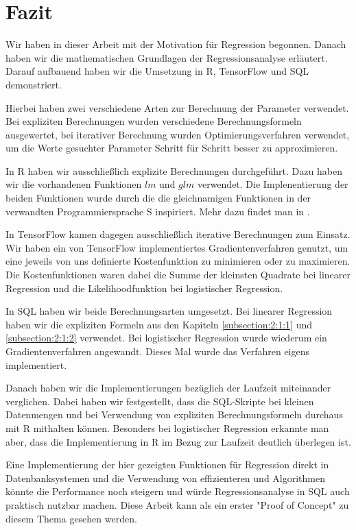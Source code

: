 \chapter{Fazit}
\label{chapter:6}

Wir haben in dieser Arbeit mit der Motivation für Regression begonnen. Danach haben wir die mathematischen Grundlagen der Regressionsanalyse erläutert. Darauf aufbauend haben wir die Umsetzung in R, TensorFlow und SQL demonstriert.

Hierbei haben zwei verschiedene Arten zur Berechnung der Parameter verwendet. Bei expliziten Berechnungen wurden verschiedene Berechnungsformeln ausgewertet, bei iterativer Berechnung wurden Optimierungsverfahren verwendet, um die Werte gesuchter Parameter Schritt für Schritt besser zu approximieren.

In R haben wir ausschließlich explizite Berechnungen durchgeführt. Dazu haben wir die vorhandenen Funktionen $lm$ und $glm$ verwendet. Die Implenentierung der beiden Funktionen wurde durch die die gleichnamigen Funktionen in der verwandten Programmiersprache S inspiriert. Mehr dazu findet man in \cite{statistical}.

In TensorFlow kamen dagegen ausschließlich iterative Berechnungen zum Einsatz. Wir haben ein von TensorFlow implementiertes Gradientenverfahren genutzt, um eine jeweils von uns definierte Kostenfunktion zu minimieren oder zu maximieren. Die Kostenfunktionen waren dabei die Summe der kleinsten Quadrate bei linearer Regression und die Likelihoodfunktion bei logistischer Regression.

In SQL haben wir beide Berechnungsarten umgesetzt. Bei linearer Regression haben wir die expliziten Formeln aus den Kapiteln \ref{subsection:2:1:1} und \ref{subsection:2:1:2} verwendet. Bei logistischer Regression wurde wiederum ein Gradientenverfahren angewandt. Dieses Mal wurde das Verfahren eigens implementiert.

Danach haben wir die Implementierungen bezüglich der Laufzeit miteinander verglichen. Dabei haben wir festgestellt, dass die SQL-Skripte bei kleinen Datenmengen und bei Verwendung von expliziten Berechnungsformeln durchaus mit R mithalten können. Besonders bei logistischer Regression erkannte man aber, dass die Implementierung in R im Bezug zur Laufzeit deutlich überlegen ist.

Eine Implementierung der hier gezeigten Funktionen für Regression direkt in Datenbanksystemen und die Verwendung von effizienteren und Algorithmen könnte die Performance noch steigern und würde Regressionsanalyse in SQL auch praktisch nutzbar machen. Diese Arbeit kann als ein erster "Proof of Concept" zu diesem Thema gesehen werden.
